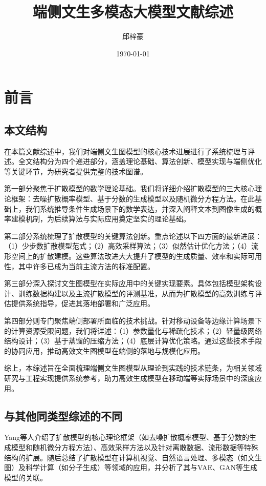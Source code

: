 \documentclass[11pt,a4paper,UTF8]{ctexart}
\title{端侧文生多模态大模型文献综述}
\author{邱梓豪}
\date{\today}
\begin{document}
\setcounter{tocdepth}{2}

\maketitle
\tableofcontents
\newpage

\section{前言}

\subsection{本文结构}

在本篇文献综述中，我们对端侧文生图模型的核心技术进展进行了系统梳理与评述。全文结构分为四个递进部分，涵盖理论基础、算法创新、模型实现与端侧优化等关键环节，为研究者提供完整的技术图谱。

第一部分聚焦于扩散模型的数学理论基础。我们将详细介绍扩散模型的三大核心理论框架：去噪扩散概率模型、基于分数的生成模型以及随机微分方程方法。在此基础上，我们系统推导条件生成场景下的数学表达，并深入阐释文本到图像生成的概率建模机制，为后续算法与实际应用奠定坚实的理论基础。

第二部分系统梳理了扩散模型的关键算法创新。重点论述以下四方面的最新进展：（1）少步数扩散模型范式；（2）高效采样算法；（3）似然估计优化方法；（4）流形空间上的扩散建模。这些算法改进大大提升了模型的生成质量、效率和实际可用性，其中许多已成为当前主流方法的标准配置。

第三部分深入探讨文生图模型在实际应用中的关键实现要素。具体包括模型架构设计、训练数据构建以及主流扩散模型的评测基准，从而为扩散模型的高效训练与评估提供系统指导，促进其落地部署和广泛应用。

第四部分则专门聚焦端侧部署所面临的技术挑战。针对移动设备等边缘计算场景下的计算资源受限问题，我们将详述：（1）参数量化与稀疏化技术；（2）轻量级网络结构设计；（3）基于蒸馏的压缩方法；（4）底层计算优化策略。通过这些技术手段的协同应用，推动高效文生图模型在端侧的落地与规模化应用。

综上，本综述旨在全面梳理端侧文生图模型从理论到实践的技术链条，为相关领域研究与工程实现提供系统参考，助力高效生成模型在移动端等实际场景中的深度应用。

\subsection{与其他同类型综述的不同}

Yang等人\cite{yang2023diffusion}介绍了扩散模型的核心理论框架（如去噪扩散概率模型、基于分数的生成模型和随机微分方程方法）、高效采样方法以及针对离散数据、流形数据等特殊结构的扩展。随后总结了扩散模型在计算机视觉、自然语言处理、多模态（如文生图）及科学计算（如分子生成）等领域的应用，并分析了其与VAE、GAN等生成模型的关联。
\end{document}
